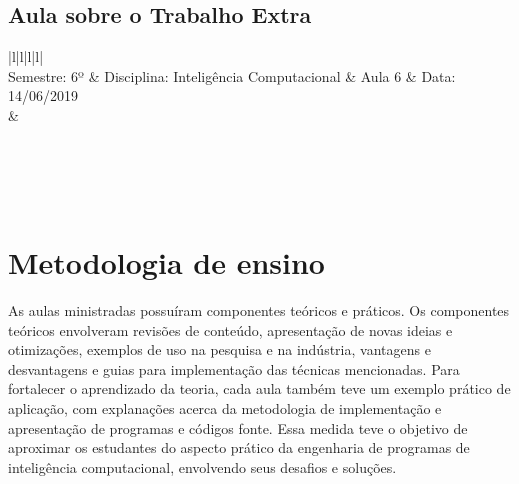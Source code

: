 \documentclass[
	12pt,				%
	openright,			%
	oneside,			%
	a4paper,			%
	chapter=TITLE,		%
	section=TITLE,		%
	english,			%
	french,				%
	spanish,			%
	brazil				%
	]{abntex2}
\begin{document}
\subsection{Aula sobre o Trabalho Extra}
\begin{tabular}{ |l|l|l|l| }
	\hline
	 \\ \hline 
	Semestre: 6º & Disciplina: Inteligência Computacional & Aula 6 & Data: 14/06/2019 \\ \hline
	 &  \\ \hline
	 \\ \hline 
	 \\ \hline 
	 \\ \hline 
	 \\ \hline
\end{tabular}

\section{Metodologia de ensino}

As aulas ministradas possuíram componentes teóricos e práticos.
Os componentes teóricos envolveram revisões de conteúdo, apresentação de novas ideias e otimizações, exemplos de uso na pesquisa e na indústria, vantagens e desvantagens e guias para implementação das técnicas mencionadas.
Para fortalecer o aprendizado da teoria, cada aula também teve um exemplo prático de aplicação, com explanações acerca da metodologia de implementação e apresentação de programas e códigos fonte.
Essa medida teve o objetivo de aproximar os estudantes do aspecto prático da engenharia de programas de inteligência computacional, envolvendo seus desafios e soluções.
\end{document}
